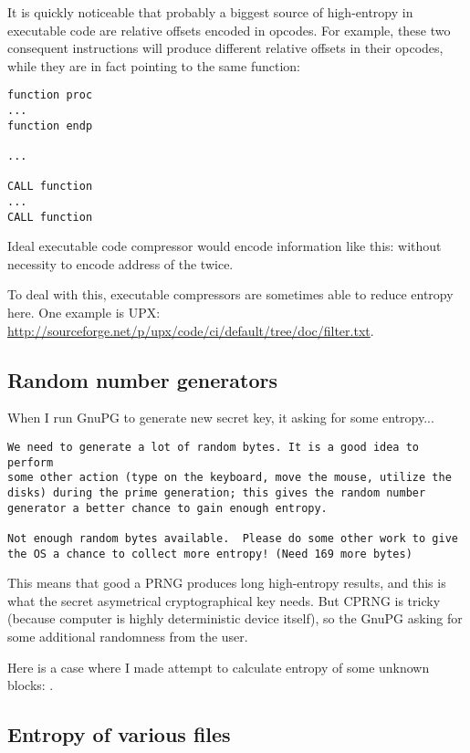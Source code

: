 It is quickly noticeable that probably a biggest source of high-entropy in executable code are relative offsets encoded in opcodes.
For example, these two consequent instructions will produce different relative offsets in their opcodes, 
while they are in fact pointing to the same function:

\begin{lstlisting}[style=customasm]
function proc
...
function endp

...

CALL function
...
CALL function
\end{lstlisting}

Ideal executable code compressor would encode information like this:
 without necessity to encode
address of the  twice.

To deal with this, executable compressors are sometimes able to reduce entropy here.
One example is UPX: \url{http://sourceforge.net/p/upx/code/ci/default/tree/doc/filter.txt}.

\subsection{Random number generators}

When I run GnuPG to generate new secret key, it asking for some entropy...

\begin{lstlisting}
We need to generate a lot of random bytes. It is a good idea to perform
some other action (type on the keyboard, move the mouse, utilize the
disks) during the prime generation; this gives the random number
generator a better chance to gain enough entropy.

Not enough random bytes available.  Please do some other work to give
the OS a chance to collect more entropy! (Need 169 more bytes)
\end{lstlisting}

This means that good a PRNG produces long high-entropy results, and this is what the secret asymetrical cryptographical key needs.
But \ac{CPRNG} is tricky (because computer is highly deterministic device itself),
so the GnuPG asking for some additional randomness from the user.

Here is a case where I made attempt to calculate entropy of some unknown blocks: .

\subsection{Entropy of various files}

